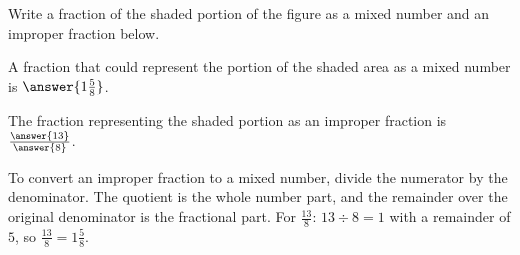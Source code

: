 \documentclass{ximera}
\begin{document}
\begin{problem}
 
Write a fraction of the shaded portion of the figure as a mixed number and an improper fraction below.
 
\begin{center}
\end{center}
 
A fraction that could represent the portion of the shaded area as a mixed number is $\answer{1\frac{5}{8}}$.
 
The fraction representing the shaded portion as an improper fraction is $\frac{\answer{13}}{\answer{8}}$.

\begin{feedback}
To convert an improper fraction to a mixed number, divide the numerator by the denominator. The quotient is the whole number part, and the remainder over the original denominator is the fractional part. For $\frac{13}{8}$: $13 \div 8 = 1$ with a remainder of $5$, so $\frac{13}{8} = 1\frac{5}{8}$.
\end{feedback}

\end{problem}
 
\end{document}
